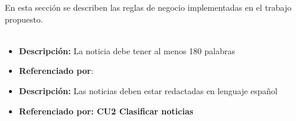 

En esta sección se describen las reglas de negocio implementadas en el trabajo propuesto.\\\\


\begin{itemize}
  \item \textbf{Descripción:}  La noticia debe tener al menos 180 palabras
  \item \textbf{Referenciado por}: 
\end{itemize}


\begin{itemize}
  \item \textbf{Descripción:} Las noticias deben estar redactadas en lenguaje español
  \item \textbf{Referenciado por: CU2 Clasificar noticias}  \\
\end{itemize}

